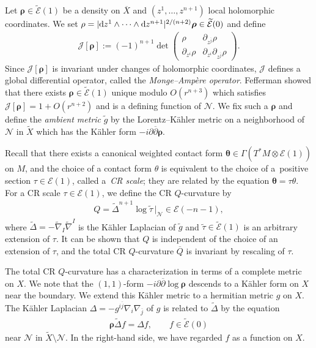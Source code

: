 \documentclass[10pt,a4paper]{amsart}
\numberwithin{equation}{section}
\begin{document}
Let $\boldsymbol\rho\in\widetilde{\mathcal{E}}(1)$ be a density on $\overline X$ and $(z^1, \dots, z^{n+1})$ local holomorphic coordinates. We set $\rho=|{\rm d}z^1\wedge\cdots\wedge {\rm d}z^{n+1}|^{2/(n+2)}\boldsymbol\rho\in\widetilde{\mathcal{E}}(0)$ and def\/ine
\begin{gather*}
\mathcal{J}[\boldsymbol\rho]:=(-1)^{n+1}\det
\begin{pmatrix}
\rho & \partial_{z^{\overline j}}\rho \\
\partial_{z^i}\rho & \partial_{z^i}\partial_{z^{\overline j}}\rho
\end{pmatrix}.
\end{gather*}
Since $\mathcal{J}[\boldsymbol\rho]$ is invariant under changes of holomorphic coordinates, $\mathcal{J}$ def\/ines a global dif\/ferential operator, called the {\it Monge--Amp\`ere operator}. Fef\/ferman \cite{Fefferman} showed that there exists $\boldsymbol\rho\in\widetilde{\mathcal{E}}(1)$ unique modulo
$O(r^{n+3})$ which satisf\/ies $\mathcal{J}[\boldsymbol\rho]=1+O(r^{n+2})$ and is a def\/ining function of $\mathcal{N}$.
We f\/ix such a $\boldsymbol\rho$ and def\/ine the {\it ambient metric} $\widetilde g$ by the Lorentz--K\"ahler metric on a neighborhood of $\mathcal{N}$ in $\widetilde X$ which has the K\"ahler form $-i\partial\overline{\partial}\boldsymbol\rho$.

Recall that there exists a canonical weighted contact form $\boldsymbol{\theta}\in \Gamma(T^\ast M\otimes\mathcal{E}(1))$ on $M$, and the choice of a contact form $\theta$ is equivalent to the choice of a~positive section $\tau\in\mathcal{E}(1)$, called a~{\it CR scale};
they are related by the equation $\boldsymbol{\theta}=\tau \theta$. For a CR scale $\tau\in\mathcal{E}(1)$, we def\/ine the CR $Q$-curvature by
\begin{gather*}
Q=\widetilde{\Delta}^{n+1}\log\widetilde\tau\, |_{\mathcal{N}}\in\mathcal{E}(-n-1),
\end{gather*}
where $\widetilde\Delta=-\widetilde\nabla_I\widetilde\nabla^I$ is the K\"ahler Laplacian of $\widetilde g$ and $\widetilde\tau\in\widetilde{\mathcal{E}}(1)$ is an arbitrary extension of $\tau$. It can be shown that $Q$ is independent of the choice of an extension of $\tau$, and the total CR $Q$-curvature
$\overline{Q}$ is invariant by rescaling of $\tau$.

The total CR $Q$-curvature has a characterization in terms of a complete metric on $X$. We note that the $(1, 1)$-form $-i\partial\overline{\partial}\log \boldsymbol\rho$ descends to a K\"ahler form on $X$ near the boundary. We extend this K\"ahler metric to a hermitian metric $g$ on $X$. The K\"ahler Laplacian $\Delta=-g^{i\overline j}\nabla_i\nabla_{\overline j}$ of $g$ is related to $\widetilde\Delta$ by the equation
\begin{gather}\label{laplacians}
\boldsymbol\rho\widetilde\Delta f=\Delta f, \qquad f\in\widetilde{\mathcal{E}}(0)
\end{gather}
near $\mathcal{N}$ in $\widetilde X\setminus\mathcal{N}$. In the right-hand side, we have regarded $f$ as a function on $X$.
\end{document}
